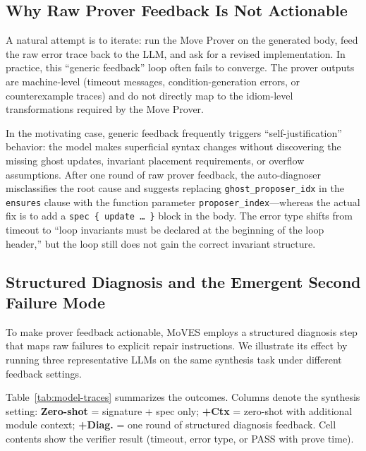 \subsection{Why Raw Prover Feedback Is Not Actionable}

A natural attempt is to iterate: run the Move Prover on the generated body, feed the raw error trace back to the LLM, and ask for a revised implementation.
In practice, this ``generic feedback'' loop often fails to converge.
The prover outputs are machine-level (timeout messages, condition-generation errors, or counterexample traces) and do not directly map to the idiom-level transformations required by the Move Prover.

In the motivating case, generic feedback frequently triggers ``self-justification'' behavior: the model makes superficial syntax changes without discovering the missing ghost updates, invariant placement requirements, or overflow assumptions.
After one round of raw prover feedback, the auto-diagnoser misclassifies the root cause and suggests replacing \texttt{ghost\_proposer\_idx} in the \texttt{ensures} clause with the function parameter \texttt{proposer\_index}---whereas the actual fix is to add a \texttt{spec\,\{\,update\,\ldots\,\}} block in the body.
The error type shifts from timeout to ``loop invariants must be declared at the beginning of the loop header,'' but the loop still does not gain the correct invariant structure.

\subsection{Structured Diagnosis and the Emergent Second Failure Mode}

To make prover feedback actionable, MoVES employs a structured diagnosis step that maps raw failures to explicit repair instructions.
We illustrate its effect by running three representative LLMs on the same synthesis task under different feedback settings.

Table~\ref{tab:model-traces} summarizes the outcomes.
Columns denote the synthesis setting: \textbf{Zero-shot} = signature + spec only; \textbf{+Ctx} = zero-shot with additional module context; \textbf{+Diag.} = one round of structured diagnosis feedback.
Cell contents show the verifier result (timeout, error type, or PASS with prove time).

